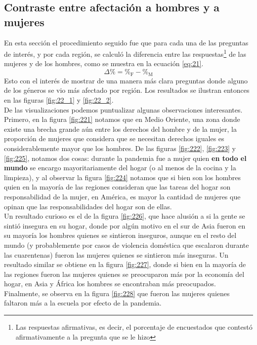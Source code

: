 \documentclass[12pt]{article}
\begin{document}
\subsection{Contraste entre afectación a hombres y a mujeres}
En esta sección el procedimiento seguido fue que para cada una de las preguntas de interés, y por cada región, se calculó la diferencia entre las respuestas\footnote{Las respuestas afirmativas, es decir, el porcentaje de encuestados que contestó afirmativamente a la pregunta que se le hizo} de las mujeres y de los hombres, como se muestra en la ecuación \ref{eq:21}.
\begin{equation}
\Delta \% = \%_{\text{F}}-\%_{\text{M}}
    \label{eq:21}
\end{equation}
Esto con el interés de mostrar de una manera más clara preguntas donde alguno de los géneros se vio más afectado por región. Los resultados se ilustran entonces en las figuras \ref{fig:22_1} y \ref{fig:22_2}. 
\\De las visualizaciones podemos puntualizar algunas observaciones interesantes. Primero, en la figura \ref{fig:221} notamos que en Medio Oriente, una zona donde existe una brecha grande aún entre los derechos del hombre y de la mujer, la proporción de mujeres que considera que se necesitan derechos iguales es considerablemente mayor que los hombres. De las figuras \ref{fig:222},  \ref{fig:223} y \ref{fig:225}, notamos dos cosas: durante la pandemia fue a mujer quien \textbf{en todo el mundo} se encargo mayoritariamente del hogar (o al menos de la cocina y la limpieza), y al observar la figura \ref{fig:224} notamos que si bien son los hombres quien en la mayoría de las regiones consideran que las tareas del hogar son responsabilidad de la mujer, en América, es mayor la cantidad de mujeres que opinan que las responsabilidades del hogar son de ellas.\\
Un resultado curioso es el de la figura \ref{fig:226}, que hace alusión a si la gente se sintió insegura en su hogar, donde por algún motivo en el sur de Asia fueron en su mayoría los hombres quienes se sintieron inseguros, aunque en el resto del mundo (y probablemente por casos de violencia doméstica que escalaron durante las cuarentenas) fueron las mujeres quienes se sintieron más inseguras. Un resultado similar se obtiene en la figura \ref{fig:227}, donde si bien en la mayoría de las regiones fueron las mujeres quienes se preocuparon más por la economía del hogar, en Asia y África los hombres se encontraban más preocupados. Finalmente, se observa en la figura \ref{fig:228} que fueron las mujeres quienes faltaron más a la escuela por efecto de la pandemia.\\
\end{document}
